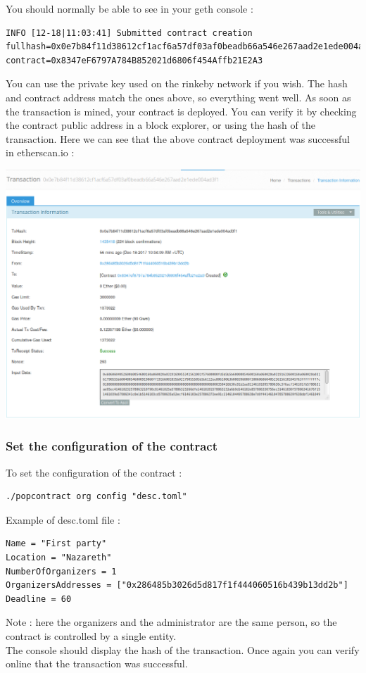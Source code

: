 \documentclass[11pt, a4paper, twoside, openright]{book} %
\begin{document}
You should normally be able to see in your geth console :
\begin{verbatim}
INFO [12-18|11:03:41] Submitted contract creation
fullhash=0x0e7b84f11d38612cf1acf6a57df03af0beadb66a546e267aad2e1ede004ad3f1
contract=0x8347eF6797A784B852021d6806f454Affb21E2A3
\end{verbatim}
You can use the private key used on the rinkeby network if you wish.
The hash and contract address match the ones above, so everything went well.
As soon as the transaction is mined, your contract is deployed. You can verify it by checking the contract public address in a block explorer, or using the hash of the transaction. Here we can see that the above contract deployment was successful in etherscan.io :
\begin{center}
 \includegraphics[scale=0.38]{blockexplorer.jpg}
\end{center}
\subsubsection*{Set the configuration of the contract}

To set the configuration of the contract :
\begin{verbatim}
./popcontract org config "desc.toml"
\end{verbatim}
Example of desc.toml file :
\begin{verbatim}
Name = "First party"
Location = "Nazareth"
NumberOfOrganizers = 1
OrganizersAddresses = ["0x286485b3026d5d817f1f444060516b439b13dd2b"]
Deadline = 60
\end{verbatim}
Note : here the organizers and the administrator are the same person, so the contract is controlled by a single entity.\\
The console should display the hash of the transaction. Once again you can verify online that the transaction was successful.
\end{document}
